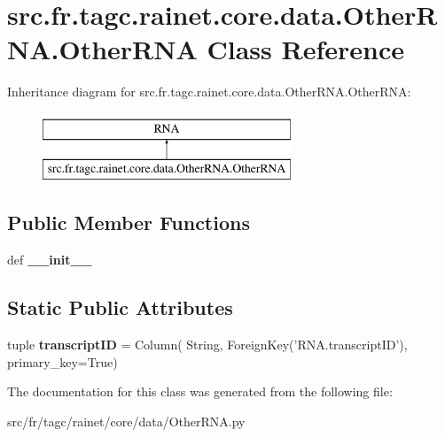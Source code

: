\hypertarget{classsrc_1_1fr_1_1tagc_1_1rainet_1_1core_1_1data_1_1OtherRNA_1_1OtherRNA}{\section{src.\-fr.\-tagc.\-rainet.\-core.\-data.\-Other\-R\-N\-A.\-Other\-R\-N\-A Class Reference}
\label{classsrc_1_1fr_1_1tagc_1_1rainet_1_1core_1_1data_1_1OtherRNA_1_1OtherRNA}
}
Inheritance diagram for src.\-fr.\-tagc.\-rainet.\-core.\-data.\-Other\-R\-N\-A.\-Other\-R\-N\-A\-:\begin{figure}[H]
\begin{center}
\leavevmode
\includegraphics[height=2.000000cm]{classsrc_1_1fr_1_1tagc_1_1rainet_1_1core_1_1data_1_1OtherRNA_1_1OtherRNA}
\end{center}
\end{figure}
\subsection*{Public Member Functions}
\begin{DoxyCompactItemize}
\item 
\hypertarget{classsrc_1_1fr_1_1tagc_1_1rainet_1_1core_1_1data_1_1OtherRNA_1_1OtherRNA_a112e0c178c2a8c9db820083db204cde9}{def {\bfseries \-\_\-\-\_\-init\-\_\-\-\_\-}}\label{classsrc_1_1fr_1_1tagc_1_1rainet_1_1core_1_1data_1_1OtherRNA_1_1OtherRNA_a112e0c178c2a8c9db820083db204cde9}

\end{DoxyCompactItemize}
\subsection*{Static Public Attributes}
\begin{DoxyCompactItemize}
\item 
\hypertarget{classsrc_1_1fr_1_1tagc_1_1rainet_1_1core_1_1data_1_1OtherRNA_1_1OtherRNA_a46996fd0826c790be10d44e5ccf81c9c}{tuple {\bfseries transcript\-I\-D} = Column( String, Foreign\-Key('R\-N\-A.\-transcript\-I\-D'), primary\-\_\-key=True)}\label{classsrc_1_1fr_1_1tagc_1_1rainet_1_1core_1_1data_1_1OtherRNA_1_1OtherRNA_a46996fd0826c790be10d44e5ccf81c9c}

\end{DoxyCompactItemize}


The documentation for this class was generated from the following file\-:\begin{DoxyCompactItemize}
\item 
src/fr/tagc/rainet/core/data/Other\-R\-N\-A.\-py\end{DoxyCompactItemize}

